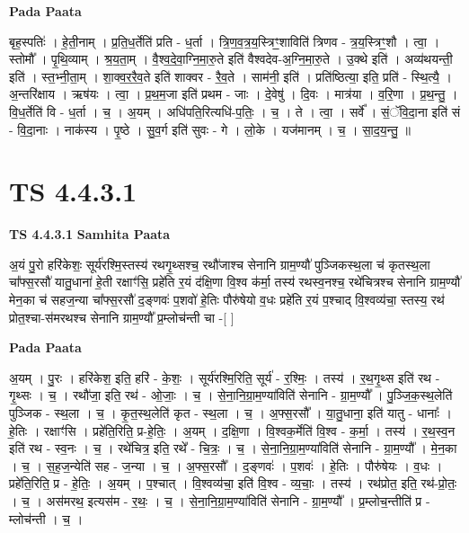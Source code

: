 \documentclass[17pt]{extarticle}
\begin{document}
\textbf{Pada Paata} \newline

बृह॒स्पतिः॑ । हे॒ती॒नाम् । प्र॒ति॒ध॒र्तेति॑ प्रति - ध॒र्ता । त्रि॒ण॒व॒त्र॒य॒स्त्रिꣳ॒॒शाविति॑ त्रिणव - त्र॒य॒स्त्रिꣳ॒॒शौ । त्वा॒ । स्तोमौ᳚ । पृ॒थि॒व्याम् । श्र॒य॒ता॒म् । वै॒श्व॒दे॒वा॒ग्नि॒मा॒रु॒ते इति॑ वैश्वदेव-अ॒ग्नि॒मा॒रु॒ते । उ॒क्थे इति॑ । अव्य॑थयन्ती॒ इति॑ । स्त॒भ्नी॒ता॒म् । शा॒क्व॒र॒रै॒व॒ते इति॑ शाक्वर - रै॒व॒ते । साम॑नी॒ इति॑ । प्रति॑ष्ठित्या॒ इति॒ प्रति॑ - स्थि॒त्यै॒ । अ॒न्तरि॑क्षाय । ऋष॑यः । त्वा॒ । प्र॒थ॒म॒जा इति॑ प्रथम - जाः । दे॒वेषु॑ । दि॒वः । मात्र॑या । व॒रि॒णा । प्र॒थ॒न्तु॒ । वि॒ध॒र्तेति॑ वि - ध॒र्ता । च॒ । अ॒यम् । अधि॑पति॒रित्यधि॑-प॒तिः॒ । च॒ । ते । त्वा॒ । सर्वे᳚ । सं॒ॅवि॒दा॒ना इति॑ सं - वि॒दा॒नाः । नाक॑स्य । पृ॒ष्ठे । सु॒व॒र्ग इति॑ सुवः - गे । लो॒के । यज॑मानम् । च॒ । सा॒द॒य॒न्तु॒ ॥  \newline





\section{ TS 4.4.3.1 }

\textbf{TS 4.4.3.1 } \newline
\textbf{Samhita Paata} \newline

अ॒यं पु॒रो हरि॑केशः॒ सूर्य॑रश्मि॒स्तस्य॑ रथगृ॒थ्सश्च॒ रथौ॑जाश्च सेनानि ग्राम॒ण्यौ॑ पुञ्जिकस्थ॒ला च॑ कृतस्थ॒ला चा᳚फ्स॒रसौ॑ यातु॒धाना॑ हे॒ती रक्षाꣳ॑सि॒ प्रहे॑ति र॒यं द॑क्षि॒णा वि॒श्व क॑र्मा॒ तस्य॑ रथस्व॒नश्च॒ रथे॑चित्रश्च सेनानि ग्राम॒ण्यौ॑ मेन॒का च॑ सहज॒न्या चा᳚फ्स॒रसौ॑ द॒ङ्णवः॑ प॒शवो॑ हे॒तिः पौरु॑षेयो व॒धः प्रहे॑ति र॒यं प॒श्चाद् वि॒श्वव्य॑चा॒ स्तस्य॒ रथ॑ प्रोत॒श्चा-स॑मरथश्च सेनानि ग्राम॒ण्यौ᳚ प्र॒म्लोच॑न्ती चा -[  ] \newline

\textbf{Pada Paata} \newline

अ॒यम् । पु॒रः । हरि॑केश॒ इति॒ हरि॑ - के॒शः॒ । सूर्य॑रश्मि॒रिति॒ सूर्य॑ - र॒श्मिः॒ । तस्य॑ । र॒थ॒गृ॒थ्स इति॑ रथ - गृ॒थ्सः । च॒ । रथौ॑जा॒ इति॒ रथ॑ - ओ॒जाः॒ । च॒ । से॒ना॒नि॒ग्रा॒म॒ण्या॑विति॑ सेनानि - ग्रा॒म॒ण्यौ᳚ । पु॒ञ्जि॒क॒स्थ॒लेति॑ पुञ्जिक - स्थ॒ला । च॒ । कृ॒त॒स्थ॒लेति॑ कृत - स्थ॒ला । च॒ । अ॒फ्स॒रसौ᳚ । या॒तु॒धाना॒ इति॑ यातु - धानाः᳚ । हे॒तिः । रक्षाꣳ॑सि । प्रहे॑ति॒रिति॒ प्र-हे॒तिः॒ । अ॒यम् । द॒क्षि॒णा । वि॒श्वक॒र्मेति॑ वि॒श्व - क॒र्मा॒ । तस्य॑ । र॒थ॒स्व॒न इति॑ रथ - स्व॒नः । च॒ । रथे॑चित्र॒ इति॒ रथे᳚ - चि॒त्रः॒ । च॒ । से॒ना॒नि॒ग्रा॒म॒ण्या॑विति॑ सेनानि - ग्रा॒म॒ण्यौ᳚ । मे॒न॒का । च॒ । स॒ह॒ज॒न्येति॑ सह - ज॒न्या । च॒ । अ॒फ्स॒रसौ᳚ । द॒ङ्णवः॑ । प॒शवः॑ । हे॒तिः । पौरु॑षेयः । व॒धः । प्रहे॑ति॒रिति॒ प्र - हे॒तिः॒ । अ॒यम् । प॒श्चात् । वि॒श्वव्य॑चा॒ इति॑ वि॒श्व - व्य॒चाः॒ । तस्य॑ । रथ॑प्रोत॒ इति॒ रथ॑-प्रो॒तः॒ । च॒ । अस॑मरथ॒ इत्यस॑म - र॒थः॒ । च॒ । से॒ना॒नि॒ग्रा॒म॒ण्या॑विति॑ सेनानि - ग्रा॒म॒ण्यौ᳚ । प्र॒म्लोच॒न्तीति॑ प्र - म्लोच॑न्ती । च॒ ।  \newline
\end{document}

